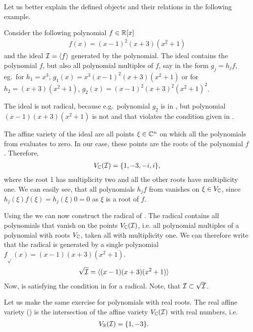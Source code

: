 
Let us better explain the defined objects and their relations in the following example.

\begin{example}
  Consider the following polynomial $f\in\mathbb{R}[x]$
  \begin{align}
    f(x) = (x-1)^2(x+3)(x^2+1)
  \end{align}
  and the ideal $\mathcal{I} = \langle f \rangle$ generated by the polynomial.
  The ideal \Ideal{} contains the polynomial $f$, but also all polynomial multiples of $f$, say in the form $g_j = h_jf$, eg.\ for $h_1 = x^3$, $g_1(x) = x^3(x-1)^2(x+3)(x^2+1)$ or for $h_2 = (x+3)(x^2+1)$, $g_2(x) = (x-1)^2(x+3)^2(x^2+1)^2$.

  The ideal \Ideal{} is not radical, because e.g.\ polynomial $g_2$ is in \Ideal{}, but polynomial $(x-1)(x+3)(x^2+1)$ is not and that violates the condition given in .

  The affine variety \VarC{} of the ideal \Ideal{} are all points $\xi \in \mathbb{C}^n$ on which all the polynomials from \Ideal{} evaluates to zero. In our case, these points are the roots of the polynomial $f$. Therefore,
  \begin{align}
    V_{\mathbb{C}}(\mathcal{I}) = \{1, -3, -i, i\},
  \end{align}
  where the root 1 has multiplicity two and all the other roots have multiplicity one.
  We can easily see, that all polynomials $h_jf$ from \Ideal{} vanishes on $\xi \in V_{\mathbb{C}}$, since $h_j(\xi)f(\xi) = h_j(\xi)0 = 0$ as $\xi$ is a root of $f$.

  Using the  we can now construct the radical of \Ideal{}.
  The radical \rIdeal{} contains all polynomials that vanish on the points $V_{\mathbb{C}}(\mathcal{I})$, i.e. all polynomial multiples of a polynomial with roots $V_{\mathbb{C}}$, taken all with multiplicity one.
  We can therefore write that the radical is generated by a single polynomial $f_{\sqrt{}}(x) = (x-1)(x+3)(x^2+1)$.
  \begin{align}
    \sqrt{\mathcal{I}} &= \langle (x-1)(x+3)(x^2+1) \rangle
  \end{align}
  Now, \rIdeal{} is satisfying the condition in  for a radical.
  Note, that $\mathcal{I}{} \subset \sqrt{\mathcal{I}}{}$.

  Let us make the same exercise for polynomials with real roots.
  The real affine variety \VarR(\Ideal) is the intersection of the affine variety $V_{\mathbb{C}}(\mathcal{I})$ with real numbers, i.e.\
  \begin{align}
    V_{\mathbb{R}}(\mathcal{I}) &= \{1, -3\}.
  \end{align}


\end{example}
